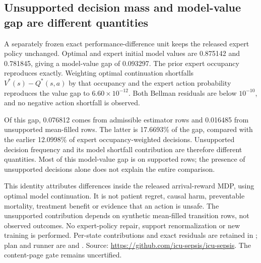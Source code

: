 \subsection{Unsupported decision mass and model-value gap are different quantities}
A separately frozen exact performance-difference unit keeps the released expert policy unchanged. Optimal and expert initial model values are 0.875142 and 0.781845, giving a model-value gap of 0.093297. The prior expert occupancy reproduces exactly. Weighting optimal continuation shortfalls $V^*(s)-Q^*(s,a)$ by that occupancy and the expert action probability reproduces the value gap to $6.60\times10^{-12}$. Both Bellman residuals are below $10^{-10}$, and no negative action shortfall is observed.

Of this gap, 0.076812 comes from admissible estimator rows and 0.016485 from unsupported mean-filled rows. The latter is 17.6693\% of the gap, compared with the earlier 12.0998\% of expert occupancy-weighted decisions. Unsupported decision frequency and its model shortfall contribution are therefore different quantities. Most of this model-value gap is on supported rows; the presence of unsupported decisions alone does not explain the entire comparison.

This identity attributes differences inside the released arrival-reward MDP, using optimal model continuation. It is not patient regret, causal harm, preventable mortality, treatment benefit or evidence that an action is unsafe. The unsupported contribution depends on synthetic mean-filled transition rows, not observed outcomes. No expert-policy repair, support renormalization or new training is performed. Per-state contributions and exact residuals are retained in ; plan and runner are  and . Source: \url{https://github.com/icu-sepsis/icu-sepsis}. The content-page gate remains uncertified.
